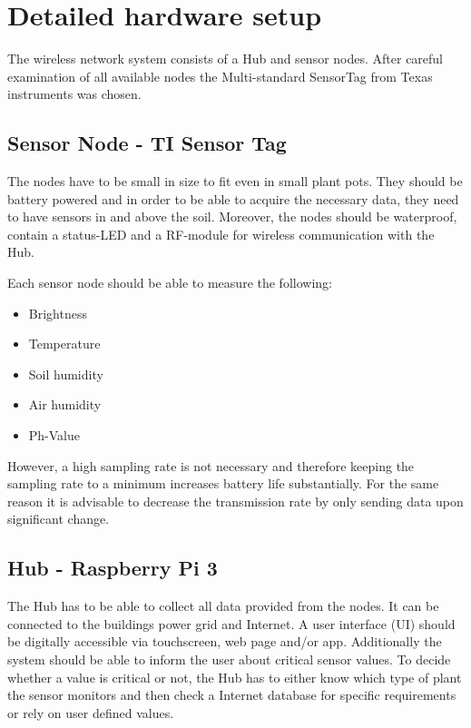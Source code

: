 \section{Detailed hardware setup}

The wireless network system consists of a Hub and sensor nodes. After careful examination of all available nodes the Multi-standard SensorTag from Texas instruments \cite{TIsensortag} was chosen.


\subsection{Sensor Node - TI Sensor Tag}
The nodes have to be small in size to fit even in small plant pots. They should be battery powered and in order to be able to acquire the necessary data, they need to have sensors in and above the soil. Moreover, the nodes should be waterproof, contain a status-LED and a RF-module for wireless communication with the Hub.

Each sensor node should be able to measure the following:
\begin{itemize}
	\item Brightness 
	\item Temperature
	\item Soil humidity
	\item Air humidity
	\item Ph-Value
\end{itemize}

However, a high sampling rate is not necessary and therefore keeping the sampling rate to a minimum increases battery life substantially. For the same reason it is advisable to decrease the transmission rate by only sending data upon significant change.

\subsection{Hub - Raspberry Pi 3}
The Hub has to be able to collect all data provided from the nodes. It can be connected to the buildings power grid and Internet. A user interface (UI) should be digitally accessible via touchscreen, web page and/or app. Additionally the system should be able to inform the user about critical sensor values. To decide whether a value is critical or not, the Hub has to either know which type of plant the sensor monitors and then check a Internet database for specific requirements or rely on user defined values.
